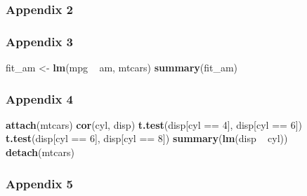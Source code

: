\documentclass[]{article}
\newenvironment{Shaded}{\begin{snugshade}}{\end{snugshade}}
\newcommand{\KeywordTok}[1]{\textcolor[rgb]{0.13,0.29,0.53}{\textbf{{#1}}}}
\newcommand{\DecValTok}[1]{\textcolor[rgb]{0.00,0.00,0.81}{{#1}}}
\newcommand{\StringTok}[1]{\textcolor[rgb]{0.31,0.60,0.02}{{#1}}}
\newcommand{\NormalTok}[1]{{#1}}
\begin{document}
\subsubsection{Appendix 2}\label{appendix-2}

\begin{Shaded}
\end{Shaded}

\subsubsection{Appendix 3}\label{appendix-3}

\begin{Shaded}
\begin{Highlighting}[]
\NormalTok{fit_am <-}\StringTok{ }\KeywordTok{lm}\NormalTok{(mpg ~}\StringTok{ }\NormalTok{am, mtcars)}
\KeywordTok{summary}\NormalTok{(fit_am)}
\end{Highlighting}
\end{Shaded}

\subsubsection{Appendix 4}\label{appendix-4}

\begin{Shaded}
\begin{Highlighting}[]
\KeywordTok{attach}\NormalTok{(mtcars)}
\KeywordTok{cor}\NormalTok{(cyl, disp)}
\KeywordTok{t.test}\NormalTok{(disp[cyl ==}\StringTok{ }\DecValTok{4}\NormalTok{], disp[cyl ==}\StringTok{ }\DecValTok{6}\NormalTok{])}
\KeywordTok{t.test}\NormalTok{(disp[cyl ==}\StringTok{ }\DecValTok{6}\NormalTok{], disp[cyl ==}\StringTok{ }\DecValTok{8}\NormalTok{])}
\KeywordTok{summary}\NormalTok{(}\KeywordTok{lm}\NormalTok{(disp ~}\StringTok{ }\NormalTok{cyl))}
\KeywordTok{detach}\NormalTok{(mtcars)}
\end{Highlighting}
\end{Shaded}

\subsubsection{Appendix 5}\label{appendix-5}
\end{document}
